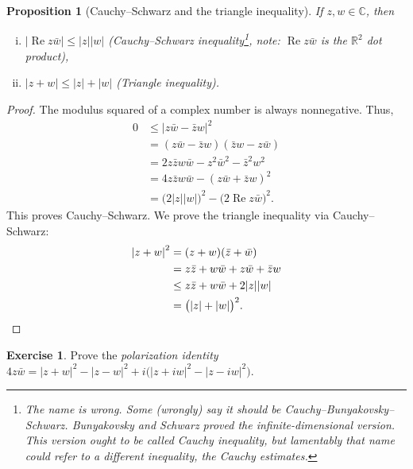 \documentclass[12pt,openany]{book}
\renewcommand{\Re}{\operatorname{Re}}
\newcommand{\sabs}[1]{\lvert {#1} \rvert}
\newcommand{\C}{{\mathbb{C}}}
\newcommand{\R}{{\mathbb{R}}}
\newcommand{\myindex}[1]{#1\index{#1}}
\theoremstyle{plain}
\newtheorem{prop}[thm]{Proposition}
\theoremstyle{remark}
\theoremstyle{definition}
\newenvironment{exbox}{%
    \def\FrameCommand{\vrule width 1pt \relax\hspace{10pt}}%
    \MakeFramed{\advance\hsize-\width\FrameRestore}%
}{%
    \endMakeFramed
}
\theoremstyle{exercise}
\newtheorem{exercise}{Exercise}[section]
\theoremstyle{example}
\begin{document}
\begin{prop}[Cauchy--Schwarz and the triangle inequality]
If $z,w \in \C$, then
\begin{enumerate}[(i)]
\item
$\sabs{\Re z\bar{w}} \leq \sabs{z} \sabs{w}$ \quad (Cauchy--Schwarz inequality\footnote{%
The name is wrong.
Some (wrongly) say it should be Cauchy--Bunyakovsky--Schwarz.
Bunyakovsky and Schwarz proved the infinite-dimensional version.
This version ought to be called
Cauchy inequality, but lamentably that name could refer to a different
inequality, the Cauchy estimates.}, note: $\Re z
\bar{w}$ is the $\R^2$ dot product),
\item
$\sabs{z+w} \leq \sabs{z} + \sabs{w}$ \quad (Triangle inequality).%
\end{enumerate}
\end{prop}

\begin{proof}
The modulus squared of a complex number is always nonnegative.
Thus,
\begin{equation*}
\begin{split}
0 & \leq {\sabs{z\bar{w}-\bar{z}w}}^2 \\
  & =    (z\bar{w}-\bar{z}w)(\bar{z}w-z\bar{w}) \\
  & =    2z\bar{z}w\bar{w} - z^2\bar{w}^2 - \bar{z}^2w^2 \\
  & =    4z\bar{z}w\bar{w} - {(z\bar{w}+\bar{z}w)}^2 \\
  & =    {\bigl(2\sabs{z}\sabs{w}\bigr)}^2 - {\bigl(2 \Re z\bar{w}\bigr)}^2 .
\end{split}
\end{equation*}
This proves Cauchy--Schwarz.  We prove the triangle inequality
via Cauchy--Schwarz:
\begin{equation*}
\begin{split}
{\sabs{z+w}}^2 & =    (z+w)(\bar{z}+\bar{w}) \\
               & =    z\bar{z} + w\bar{w} + z\bar{w} + \bar{z}w \\
               & \leq z\bar{z} + w\bar{w} + 2 \sabs{z}\sabs{w} \\
               & =    {\bigl(\sabs{z}+\sabs{w}\bigr)}^2 . \qedhere
\end{split}
\end{equation*}
\end{proof}

\begin{exbox}
\begin{exercise}
Prove the \emph{\myindex{polarization identity}}
$4 z\bar{w} =
{\sabs{z+w}}^2-{\sabs{z-w}}^2 +i \bigl( {\sabs{z+iw}}^2 - {\sabs{z-iw}}^2 \bigr)$.
\end{exercise}
\end{exbox}
\end{document}
